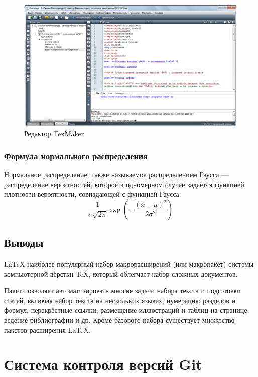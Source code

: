 \documentclass[10pt,a4paper]{article}
\begin{document}
\begin{figure}[h!]
\centering
\includegraphics[scale=0.65]{res/TexMaker}
\caption{Редактор TexMaker}
\end{figure}

\subsubsection{Формула нормального распределения}
\hspace{0,6cm}Нормальное распределение, также называемое распределением Гаусса — распределение вероятностей, которое в одномерном случае задается функцией плотности вероятности, совпадающей с функцией Гаусса:
\begin{equation}
\frac{1}{\sigma\sqrt{2\pi}}
   \exp\left(-\frac{(x-\mu)^2}{2\sigma^2}\right)
\end{equation}

\subsection{Выводы}

\hspace{0,6cm}\LaTeX{} наиболее популярный набор макрорасширений (или макропакет) системы компьютерной вёрстки \TeX{}, который облегчает набор сложных документов.

Пакет позволяет автоматизировать многие задачи набора текста и подготовки статей, включая набор текста на нескольких языках, нумерацию разделов и формул, перекрёстные ссылки, размещение иллюстраций и таблиц на странице, ведение библиографии и др. Кроме базового набора существует множество пакетов расширения \LaTeX{}.

\newpage
\section{Система контроля версий Git}
\end{document}

